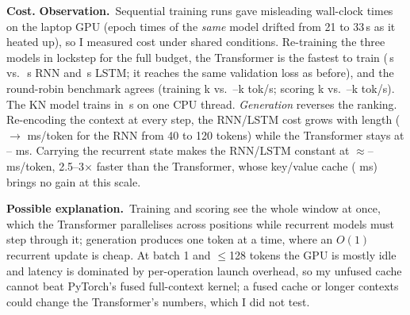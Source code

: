 \documentclass[10pt]{article}
\newcommand{\obs}{\textbf{Observation.}~}
\newcommand{\hyp}{\par\textbf{Possible explanation.}~}
\begin{document}
\textbf{Cost.} \obs Sequential training runs gave misleading wall-clock times on the laptop GPU (epoch times of the
\emph{same} model drifted from 21 to 33\,s as it heated up), so I measured cost under shared conditions. Re-training
the three models in lockstep for the full budget, the Transformer is the fastest to train (\lockTimeTr\,s vs.\
\lockTimeRnn\,s RNN and \lockTimeLstm\,s LSTM; it reaches the same validation loss as before), and the round-robin
benchmark agrees (training \bTrainTr k vs.\ \bTrainLstm--\bTrainRnn k tok/s; scoring \bInferTr k vs.\
\bInferLstm--\bInferRnn k tok/s). The KN model trains in \ngFitTime\,s on one CPU thread. \emph{Generation} reverses
the ranking. Re-encoding the context at every step, the RNN/LSTM cost grows with length (\genRnnRecShort{} $\to$
\genRnnRecLong{} ms/token for the RNN from 40 to 120 tokens) while the Transformer stays at \genTrRecShort--\genTrRecLong{}
ms. Carrying the recurrent state makes the RNN/LSTM constant at $\approx$\genRnnIncLong--\genLstmIncLong{} ms/token,
2.5--3$\times$ faster than the Transformer, whose key/value cache (\genTrIncLong{} ms) brings no gain at this
scale. \hyp Training and scoring see the whole window at once, which the Transformer parallelises across
positions while recurrent models must step through it; generation produces one token at a time, where an
$O(1)$ recurrent update is cheap. At batch 1 and $\le$128 tokens the GPU is mostly idle and latency is dominated by
per-operation launch overhead, so my unfused cache cannot beat PyTorch's fused full-context kernel; a fused cache
or longer contexts could change the Transformer's numbers, which I did not test.
\end{document}
